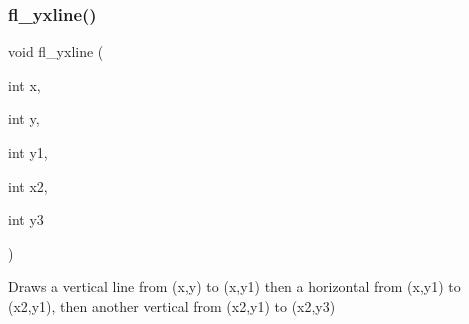 \subsubsection{\texorpdfstring{fl\+\_\+yxline()}{fl\_yxline()}\hspace{0.1cm}{\footnotesize\ttfamily [3/3]}}
{\footnotesize\ttfamily void fl\+\_\+yxline (\begin{DoxyParamCaption}\item[{int}]{x,  }\item[{int}]{y,  }\item[{int}]{y1,  }\item[{int}]{x2,  }\item[{int}]{y3 }\end{DoxyParamCaption})\hspace{0.3cm}{\ttfamily [inline]}}

Draws a vertical line from (x,y) to (x,y1) then a horizontal from (x,y1) to (x2,y1), then another vertical from (x2,y1) to (x2,y3) 